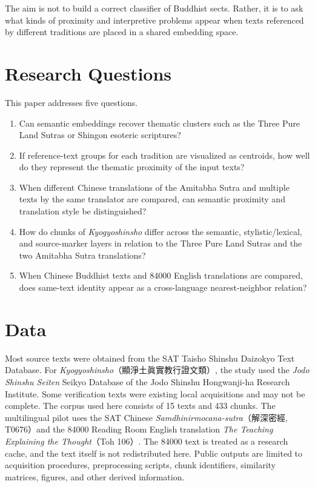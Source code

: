 \documentclass[uplatex,dvipdfmx,11pt,a4paper]{jsarticle}
\begin{document}
The aim is not to build a correct classifier of Buddhist sects. Rather, it is to ask what kinds of proximity and interpretive problems appear when texts referenced by different traditions are placed in a shared embedding space.

\section{Research Questions}

This paper addresses five questions.

\begin{enumerate}
  \item Can semantic embeddings recover thematic clusters such as the Three Pure Land Sutras or Shingon esoteric scriptures?
  \item If reference-text groups for each tradition are visualized as centroids, how well do they represent the thematic proximity of the input texts?
  \item When different Chinese translations of the Amitabha Sutra and multiple texts by the same translator are compared, can semantic proximity and translation style be distinguished?
  \item How do chunks of \textit{Kyogyoshinsho} differ across the semantic, stylistic/lexical, and source-marker layers in relation to the Three Pure Land Sutras and the two Amitabha Sutra translations?
  \item When Chinese Buddhist texts and 84000 English translations are compared, does same-text identity appear as a cross-language nearest-neighbor relation?
\end{enumerate}

\section{Data}

Most source texts were obtained from the SAT Taisho Shinshu Daizokyo Text Database. For \textit{Kyogyoshinsho}（顯淨土眞實教行證文類）, the study used the \textit{Jodo Shinshu Seiten} Seikyo Database of the Jodo Shinshu Hongwanji-ha Research Institute. Some verification texts were existing local acquisitions and may not be complete. The corpus used here consists of 15 texts and 433 chunks. The multilingual pilot uses the SAT Chinese \textit{Samdhinirmocana-sutra}（解深密經, T0676）and the 84000 Reading Room English translation \textit{The Teaching Explaining the Thought}（Toh 106）. The 84000 text is treated as a research cache, and the text itself is not redistributed here. Public outputs are limited to acquisition procedures, preprocessing scripts, chunk identifiers, similarity matrices, figures, and other derived information.
\end{document}
